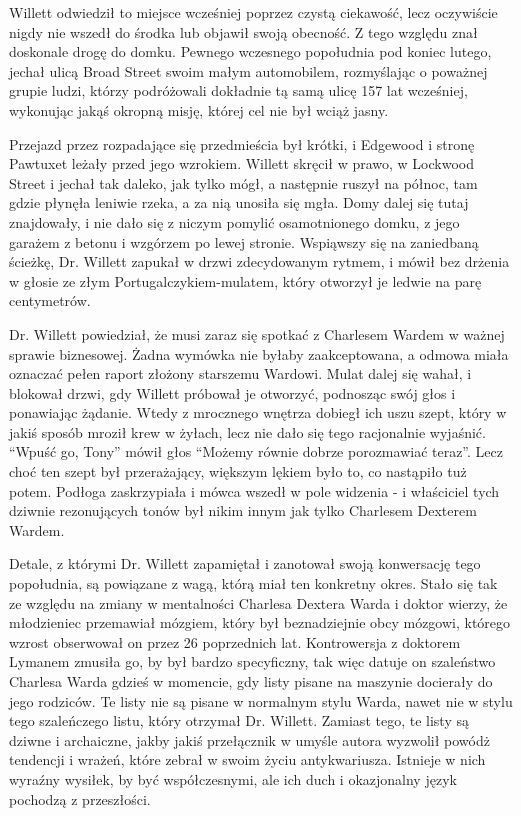 Willett odwiedził to miejsce wcześniej poprzez czystą ciekawość, lecz oczywiście nigdy nie wszedł do środka lub objawił swoją obecność. Z tego względu znał doskonale drogę do domku. Pewnego wczesnego popołudnia pod koniec lutego, jechał ulicą Broad Street swoim małym automobilem, rozmyślając o poważnej grupie ludzi, którzy podróżowali dokładnie tą samą ulicę 157 lat wcześniej, wykonując jakąś okropną misję, której cel nie był wciąż jasny. 

Przejazd przez rozpadające się przedmieścia był krótki, i Edgewood i stronę Pawtuxet leżały przed jego wzrokiem. Willett skręcił w prawo, w Lockwood Street i jechał tak daleko, jak tylko mógł, a następnie ruszył na północ, tam gdzie płynęła leniwie rzeka, a za nią unosiła się mgła. Domy dalej się tutaj znajdowały, i nie dało się z niczym pomylić osamotnionego domku, z jego garażem z betonu i wzgórzem po lewej stronie. Wspiąwszy się na zaniedbaną ścieżkę, Dr. Willett zapukał w drzwi zdecydowanym rytmem, i mówił bez drżenia w głosie ze złym Portugalczykiem-mulatem, który otworzył je ledwie na parę centymetrów. 

Dr. Willett powiedział, że musi zaraz się spotkać z Charlesem Wardem w ważnej sprawie biznesowej. Żadna wymówka nie byłaby zaakceptowana, a odmowa miała oznaczać pełen raport złożony starszemu Wardowi. Mulat dalej się wahał, i blokował drzwi, gdy Willett próbował je otworzyć, podnosząc swój głos i ponawiając żądanie. Wtedy z mrocznego wnętrza dobiegł ich uszu szept, który w jakiś sposób mroził krew w żyłach, lecz nie dało się tego racjonalnie wyjaśnić. ``Wpuść go, Tony'' mówił głos ``Możemy równie dobrze porozmawiać teraz''. Lecz choć ten szept był przerażający, większym lękiem było to, co nastąpiło tuż potem. Podłoga zaskrzypiała i mówca wszedł w pole widzenia - i właściciel tych dziwnie rezonujących tonów był nikim innym jak tylko Charlesem Dexterem Wardem.   

Detale, z którymi Dr. Willett zapamiętał i zanotował swoją konwersację tego popołudnia, są powiązane z wagą, którą miał ten konkretny okres. Stało się tak ze względu na zmiany w mentalności Charlesa Dextera Warda i doktor wierzy, że młodzieniec przemawiał mózgiem, który był beznadziejnie obcy mózgowi, którego wzrost obserwował on przez 26 poprzednich lat. Kontrowersja z doktorem Lymanem zmusiła go, by był bardzo specyficzny, tak więc datuje on szaleństwo Charlesa Warda gdzieś w momencie, gdy listy pisane na maszynie docierały do jego rodziców. Te listy nie są pisane w normalnym stylu Warda, nawet nie w stylu tego szaleńczego listu, który otrzymał Dr. Willett.  Zamiast tego, te listy są dziwne i archaiczne, jakby jakiś przełącznik w umyśle autora wyzwolił powódż tendencji i wrażeń, które zebrał w swoim życiu antykwariusza. Istnieje w nich wyraźny wysiłek, by być współczesnymi, ale ich duch i okazjonalny język pochodzą z przeszłości.

